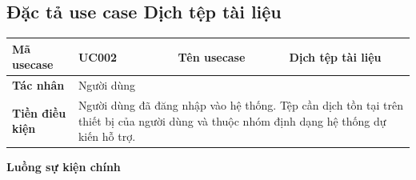\documentclass[../DoAn.tex]{subfiles}
\begin{document}
\subsection{Đặc tả use case Dịch tệp tài liệu}

\begin{longtable}{|p{3cm}|p{4cm}|p{3cm}|p{4.5cm}|}
\hline
\textbf{Mã usecase} & UC002 & \textbf{Tên usecase} & Dịch tệp tài liệu \\ \hline
\textbf{Tác nhân} & Người dùng & & \\ \hline
\textbf{Tiền điều kiện} & \multicolumn{3}{p{11.5cm}|}{Người dùng đã đăng nhập vào hệ thống. Tệp cần dịch tồn tại trên thiết bị của người dùng và thuộc nhóm định dạng hệ thống dự kiến hỗ trợ.} \\ \hline
\end{longtable}

\textbf{Luồng sự kiện chính}
\end{document}
